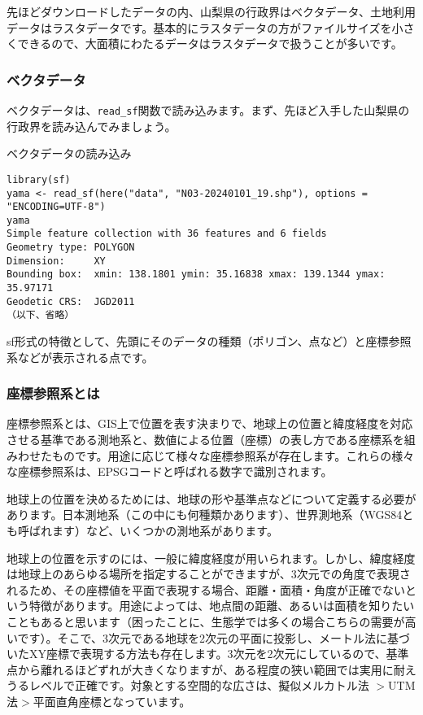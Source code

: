 先ほどダウンロードしたデータの内、山梨県の行政界はベクタデータ、土地利用データはラスタデータです。基本的にラスタデータの方がファイルサイズを小さくできるので、大面積にわたるデータはラスタデータで扱うことが多いです。

  \subsubsection{ベクタデータ}
ベクタデータは、\verb|read_sf|関数で読み込みます。まず、先ほど入手した山梨県の行政界を読み込んでみましょう。

\begin{itembox}[l]{ベクタデータの読み込み}
\begin{verbatim}
library(sf)
yama <- read_sf(here("data", "N03-20240101_19.shp"), options = "ENCODING=UTF-8")
yama
Simple feature collection with 36 features and 6 fields
Geometry type: POLYGON
Dimension:     XY
Bounding box:  xmin: 138.1801 ymin: 35.16838 xmax: 139.1344 ymax: 35.97171
Geodetic CRS:  JGD2011
（以下、省略）
\end{verbatim}
\end{itembox}
sf形式の特徴として、先頭にそのデータの種類（ポリゴン、点など）と座標参照系などが表示される点です。
  \subsubsection{座標参照系とは}
座標参照系とは、GIS上で位置を表す決まりで、地球上の位置と緯度経度を対応させる基準である測地系と、数値による位置（座標）の表し方である座標系を組みわせたものです。用途に応じて様々な座標参照系が存在します。これらの様々な座標参照系は、EPSGコードと呼ばれる数字で識別されます。

地球上の位置を決めるためには、地球の形や基準点などについて定義する必要があります。日本測地系（この中にも何種類かあります）、世界測地系（WGS84とも呼ばれます）など、いくつかの測地系があります。

地球上の位置を示すのには、一般に緯度経度が用いられます。しかし、緯度経度は地球上のあらゆる場所を指定することができますが、3次元での角度で表現されるため、その座標値を平面で表現する場合、距離・面積・角度が正確でないという特徴があります。用途によっては、地点間の距離、あるいは面積を知りたいこともあると思います（困ったことに、生態学では多くの場合こちらの需要が高いです）。そこで、3次元である地球を2次元の平面に投影し、メートル法に基づいたXY座標で表現する方法も存在します。3次元を2次元にしているので、基準点から離れるほどずれが大きくなりますが、ある程度の狭い範囲では実用に耐えうるレベルで正確です。対象とする空間的な広さは、擬似メルカトル法 $>$UTM法$>$平面直角座標となっています。

